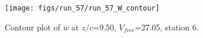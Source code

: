 \begin{figure}[H]
\centering
\texttt{[image: figs/run\_57/run\_57\_W\_contour]}
\caption{Contour plot of $\overline{w}$ at $z/c$=9.50, $V_{free}$=27.05, station 6.}
\end{figure}


